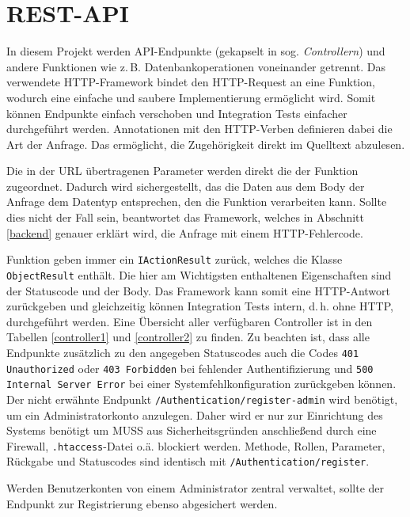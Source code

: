 \section{REST-API}
In diesem Projekt werden API-Endpunkte (gekapselt in sog. \emph{Controllern}) und andere Funktionen wie z.\,B. Datenbankoperationen voneinander getrennt.
Das verwendete HTTP-Framework bindet den HTTP-Request an eine Funktion, wodurch eine einfache und saubere Implementierung ermöglicht wird.
Somit können Endpunkte einfach verschoben und Integration Tests einfacher durchgeführt werden.
Annotationen mit den HTTP-Verben definieren dabei die Art der Anfrage.
Das ermöglicht, die Zugehörigkeit direkt im Quelltext abzulesen.

Die in der URL übertragenen Parameter werden direkt die der Funktion zugeordnet.
Dadurch wird sichergestellt, das die Daten aus dem Body der Anfrage dem Datentyp entsprechen, den die Funktion verarbeiten kann.
Sollte dies nicht der Fall sein, beantwortet das Framework, welches in Abschnitt \ref{backend} genauer erklärt wird, die Anfrage mit einem HTTP-Fehlercode.

Funktion geben immer ein \texttt{IActionResult} zurück, welches die Klasse \linebreak\texttt{ObjectResult} enthält.
Die hier am Wichtigsten enthaltenen Eigenschaften sind der Statuscode und der Body.
Das Framework kann somit eine HTTP-Antwort zurückgeben und gleichzeitig können Integration Tests intern, d.\,h. ohne HTTP, durchgeführt werden.
\linebreak
\linebreak
Eine Übersicht aller verfügbaren Controller ist in den Tabellen \vref{controller1} und \vref{controller2} zu finden. Zu beachten ist, dass alle Endpunkte zusätzlich zu den angegeben Statuscodes auch die Codes \texttt{401 Unauthorized} oder \texttt{403 Forbidden} bei fehlender Authentifizierung und \texttt{500 Internal Server Error} bei einer Systemfehlkonfiguration zurückgeben können.
\linebreak
\linebreak
Der nicht erwähnte Endpunkt \texttt{/Authentication/register-admin} wird benötigt, um ein Administratorkonto anzulegen.
Daher wird er nur zur Einrichtung des Systems benötigt um MUSS aus Sicherheitsgründen anschließend durch eine Firewall, \texttt{.htaccess}-Datei o.ä. blockiert werden.
Methode, Rollen, Parameter, Rückgabe und Statuscodes sind identisch mit \texttt{/Authentication/register}.

Werden Benutzerkonten von einem Administrator zentral verwaltet, sollte der Endpunkt zur Registrierung ebenso abgesichert werden.

